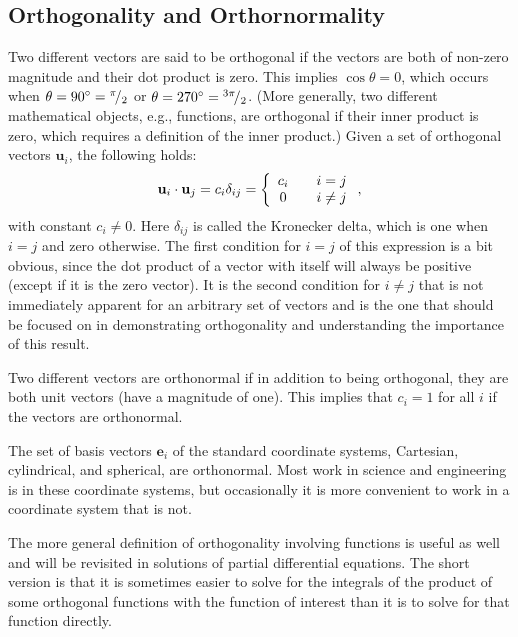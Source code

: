 \subsection{Orthogonality and Orthornormality} \label{Sec:linearAlgebra_Vectors_Orthogonality}

Two different vectors are said to be orthogonal if the vectors are both of non-zero magnitude and their dot product is zero. This implies $\cos \theta = 0$, which occurs when $\theta = 90^\circ = {}^{\pi}\!/_{2}$ or $\theta = 270^\circ = {}^{3\pi}\!/_{2}$. (More generally, two different mathematical objects, e.g., functions, are orthogonal if their inner product is zero, which requires a definition of the inner product.) Given a set of orthogonal vectors $\mathbf{u}_i$, the following holds:
\begin{align}
  \mathbf{u}_i \cdot \mathbf{u}_j = c_i \delta_{ij} = \left\{ \begin{array}{c l} c_i & \quad i = j \\ 0 & \quad i \ne j \\ \end{array} \right. ,
\end{align}
with constant $c_i \ne 0$. Here $\delta_{ij}$ is called the Kronecker delta, which is one when $i = j$ and zero otherwise. The first condition for $i = j$ of this expression is a bit obvious, since the dot product of a vector with itself will always be positive (except if it is the zero vector). It is the second condition for $i \ne j$ that is not immediately apparent for an arbitrary set of vectors and is the one that should be focused on in demonstrating orthogonality and understanding the importance of this result.

Two different vectors are orthonormal if in addition to being orthogonal, they are both unit vectors (have a magnitude of one). This implies that $c_i = 1$ for all $i$ if the vectors are orthonormal.

The set of basis vectors $\mathbf{e}_i$ of the standard coordinate systems, Cartesian, cylindrical, and spherical, are orthonormal. Most work in science and engineering is in these coordinate systems, but occasionally it is more convenient to work in a coordinate system that is not. %

The more general definition of orthogonality involving functions is useful as well and will be revisited in solutions of partial differential equations. The short version is that it is sometimes easier to solve for the integrals of the product of some orthogonal functions with the function of interest than it is to solve for that function directly.


